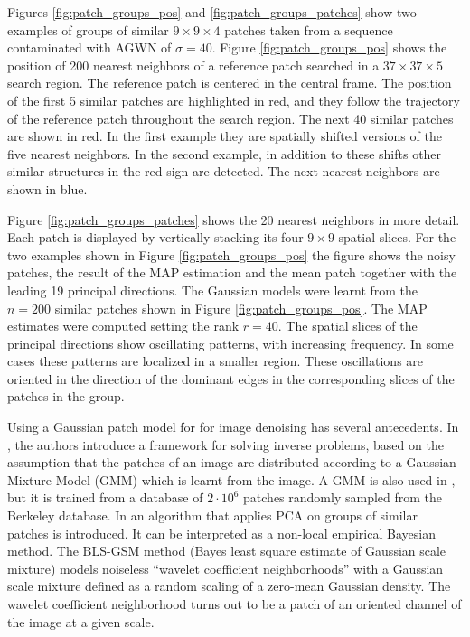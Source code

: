 \documentclass[10pt, journal, twocolumn, final, a4paper]{IEEEtran}
\begin{document}
Figures \ref{fig:patch_groups_pos} and \ref{fig:patch_groups_patches}
show two examples of groups of similar $9\times 9\times 4$ patches taken from
a sequence contaminated with AGWN of $\sigma = 40$. Figure
\ref{fig:patch_groups_pos} shows the position of 200 nearest neighbors of a
reference patch searched in a $37\times 37\times 5$ search region. The
reference patch is centered in the central frame. The position of the first 5
similar patches are highlighted in red, and they follow the trajectory of the
reference patch throughout the search region.  The next 40 similar patches are
shown in red. In the first example they are spatially shifted versions of the
five nearest neighbors. In the second example, in addition to these shifts
other similar structures in the red sign are detected.  The next nearest
neighbors are shown in blue.

Figure \ref{fig:patch_groups_patches} shows the 20 nearest neighbors in 
more detail. Each patch is displayed by vertically stacking its four $9\times
9$ spatial slices. For the two examples shown in Figure \ref{fig:patch_groups_pos}
the figure shows the noisy patches, the result of the MAP estimation and the
mean patch together with the leading 19 principal directions. The Gaussian
models were learnt from the $n = 200$ similar patches shown in Figure
\ref{fig:patch_groups_pos}. The MAP estimates were computed setting the rank $r = 40$.
The spatial slices of the principal directions show oscillating patterns, with
increasing frequency. 
In some cases these patterns are localized in a smaller region.
%
These oscillations are oriented in the direction of the
dominant edges in the corresponding slices of the patches in the group.



\bigskip

Using a Gaussian patch model for for image denoising has several antecedents.
In \cite{Yu2012},
the authors introduce a framework for solving inverse problems, based on the
assumption that the patches of an image are distributed according to a Gaussian
Mixture Model (GMM) which is learnt from
the image. A GMM is also used in \cite{Zoran2011}, but it is trained from a
database of $2\cdot 10^6$ patches randomly sampled from the Berkeley database.
In \cite{Zhang2010} an algorithm that applies PCA on groups of similar patches
is introduced. It can be interpreted as a non-local empirical Bayesian method.
%
The BLS-GSM method \cite{Portilla2003} (Bayes least square estimate of Gaussian
scale mixture) models noiseless ``wavelet coefficient neighborhoods'' with a
Gaussian scale mixture defined as a random scaling of a zero-mean Gaussian
density. The wavelet coefficient neighborhood turns out to be a patch of an
oriented channel of the image at a given scale.
\end{document}
